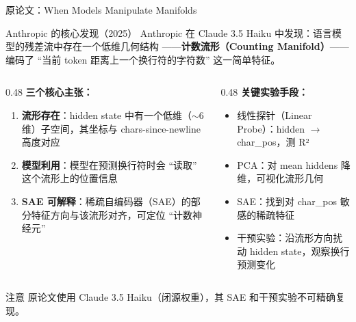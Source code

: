 % 

\begin{frame}{原论文：When Models Manipulate Manifolds}
\small
\begin{block}{Anthropic 的核心发现（2025）}
Anthropic 在 Claude 3.5 Haiku 中发现：语言模型的残差流中存在一个低维几何结构
——\textbf{计数流形（Counting Manifold）}——编码了 ``当前 token 距离上一个换行符的字符数'' 这一简单特征。
\end{block}

\begin{columns}[T,onlytextwidth]
\begin{column}{0.48\linewidth}
\textbf{三个核心主张：}
\begin{enumerate}
  \item \textbf{流形存在}：hidden state 中有一个低维（$\sim$6 维）子空间，其坐标与 chars-since-newline 高度对应
  \item \textbf{模型利用}：模型在预测换行符时会 ``读取'' 这个流形上的位置信息
  \item \textbf{SAE 可解释}：稀疏自编码器（SAE）的部分特征方向与该流形对齐，可定位 ``计数神经元''
\end{enumerate}
\end{column}
\begin{column}{0.48\linewidth}
\textbf{关键实验手段：}
\begin{itemize}
  \item 线性探针（Linear Probe）：hidden $\rightarrow$ char\_pos，测 R²
  \item PCA：对 mean hiddens 降维，可视化流形几何
  \item SAE：找到对 char\_pos 敏感的稀疏特征
  \item 干预实验：沿流形方向扰动 hidden state，观察换行预测变化
\end{itemize}
\end{column}
\end{columns}

\vspace{0.4em}
\begin{alertblock}{注意}
原论文使用 Claude 3.5 Haiku（闭源权重），其 SAE 和干预实验不可精确复现。
\end{alertblock}
\end{frame}

